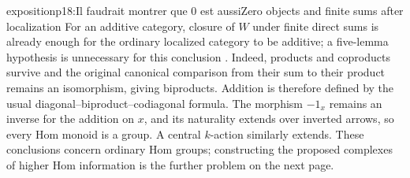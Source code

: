 \begin{dcomment}{exposition}{p18:Il faudrait montrer que 0 est aussi}{Zero objects and finite sums after localization}
For an additive category, closure of $W$ under finite direct sums is already enough for the ordinary localized category to be additive; a five-lemma hypothesis is unnecessary for this conclusion \citep[Lemma 2.2.1]{Krause2021}. Indeed, products and coproducts survive and the original canonical comparison from their sum to their product remains an isomorphism, giving biproducts. Addition is therefore defined by the usual diagonal--biproduct--codiagonal formula. The morphism $-1_x$ remains an inverse for the addition on $x$, and its naturality extends over inverted arrows, so every Hom monoid is a group. A central $k$-action similarly extends. These conclusions concern ordinary Hom groups; constructing the proposed complexes of higher Hom information is the further problem on the next page.
\end{dcomment}

